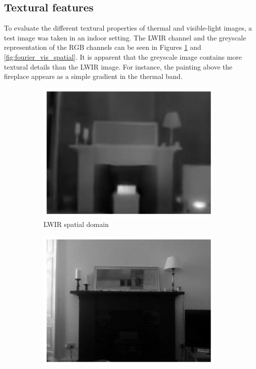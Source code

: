 \documentclass{l4proj}
\begin{document}
\subsection{Textural features}

To evaluate the different textural properties of thermal and visible-light images, a test image was taken in an indoor setting. The LWIR channel and the greyscale representation of the RGB channels can be seen in Figures \ref{fig:fourier_lwir_spatial} and \ref{fig:fourier_vis_spatial}. It is apparent that the greyscale image contains more textural details than the LWIR image. For instance, the painting above the fireplace appears as a simple gradient in the thermal band.

\begin{figure}[ht]
  \centering
  \begin{subfigure}[h!]{0.4\textwidth}
    \includegraphics[width=\textwidth]{images/fourier/lwir_spatial}
    \caption{LWIR spatial domain}
    \label{fig:fourier_lwir_spatial}
  \end{subfigure}
  \begin{subfigure}[h!]{0.4\textwidth}
    \includegraphics[width=\textwidth]{images/fourier/gray_spatial}

\end{subfigure}
\end{figure}
\end{document}
